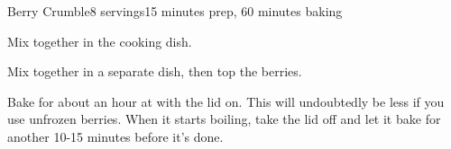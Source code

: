 \documentclass[../Cookbook.tex]{subfiles}
\begin{document}
\begin{recipe}{Berry Crumble}{8 servings}{15 minutes prep, 60 minutes baking}

	Mix together in the cooking dish.

	Mix together in a separate dish, then top the berries.

	\newstep
	Bake for about an hour at  with the lid on.
	This will undoubtedly be less if you use unfrozen berries.
	When it starts boiling, take the lid off and let it bake for another 10-15 minutes before it's done.


\end{recipe}
\end{document}
